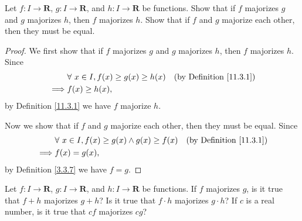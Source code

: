 \exercisesection

\begin{exercise}\label{ex 11.3.1}
    Let \(f : I \to \mathbf{R}\), \(g : I \to \mathbf{R}\), and \(h : I \to \mathbf{R}\) be functions.
    Show that if \(f\) majorizes \(g\) and \(g\) majorizes \(h\), then \(f\) majorizes \(h\).
    Show that if \(f\) and \(g\) majorize each other, then they must be equal.
\end{exercise}

\begin{proof}
    We first show that if \(f\) majorizes \(g\) and \(g\) majorizes \(h\), then \(f\) majorizes \(h\).
    Since
    \begin{align*}
                 & \forall\ x \in I, f(x) \geq g(x) \geq h(x) & \text{(by Definition \ref{11.3.1})} \\
        \implies & f(x) \geq h(x),
    \end{align*}
    by Definition \ref{11.3.1} we have \(f\) majorize \(h\).

    Now we show that if \(f\) and \(g\) majorize each other, then they must be equal.
    Since
    \begin{align*}
                 & \forall\ x \in I, f(x) \geq g(x) \land g(x) \geq f(x) & \text{(by Definition \ref{11.3.1})} \\
        \implies & f(x) = g(x),
    \end{align*}
    by Definition \ref{3.3.7} we have \(f = g\).
\end{proof}

\begin{exercise}\label{ex 11.3.2}
    Let \(f : I \to \mathbf{R}\), \(g : I \to \mathbf{R}\), and \(h : I \to \mathbf{R}\) be functions.
    If \(f\) majorizes \(g\), is it true that \(f + h\) majorizes \(g + h\)?
    Is it true that \(f \cdot h\) majorizes \(g \cdot h\)?
    If \(c\) is a real number, is it true that \(cf\) majorizes \(cg\)?
\end{exercise}

